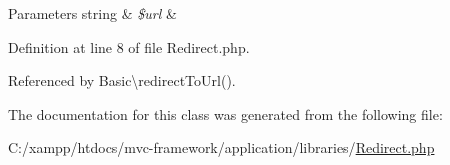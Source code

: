 \begin{DoxyParams}[1]{Parameters}
string & {\em \$url} & \\
\hline
\end{DoxyParams}


Definition at line 8 of file Redirect.\+php.



Referenced by Basic\textbackslash{}redirect\+To\+Url().




The documentation for this class was generated from the following file\+:\begin{DoxyCompactItemize}
\item 
C\+:/xampp/htdocs/mvc-\/framework/application/libraries/\hyperlink{_redirect_8php}{Redirect.\+php}\end{DoxyCompactItemize}
